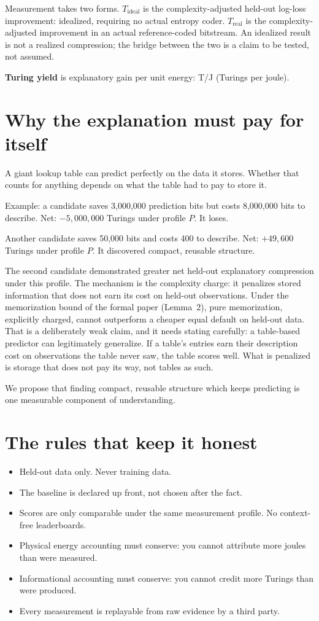 \documentclass[11pt,letterpaper]{article}
\begin{document}
Measurement takes two forms. $T_{\mathrm{ideal}}$ is the complexity-adjusted held-out log-loss improvement: idealized, requiring no actual entropy coder. $T_{\mathrm{real}}$ is the complexity-adjusted improvement in an actual reference-coded bitstream. An idealized result is not a realized compression; the bridge between the two is a claim to be tested, not assumed.

\textbf{Turing yield} is explanatory gain per unit energy: T/J (Turings per joule).

\section{Why the explanation must pay for itself}

A giant lookup table can predict perfectly on the data it stores. Whether that counts for anything depends on what the table had to pay to store it.

Example: a candidate saves 3,000,000 prediction bits but costs 8,000,000 bits to describe. Net: $-5{,}000{,}000$ Turings under profile $P$. It loses.

Another candidate saves 50,000 bits and costs 400 to describe. Net: $+49{,}600$ Turings under profile $P$. It discovered compact, reusable structure.

The second candidate demonstrated greater net held-out explanatory compression under this profile. The mechanism is the complexity charge: it penalizes stored information that does not earn its cost on held-out observations. Under the memorization bound of the formal paper (Lemma~2), pure memorization, explicitly charged, cannot outperform a cheaper equal default on held-out data. That is a deliberately weak claim, and it needs stating carefully: a table-based predictor can legitimately generalize. If a table's entries earn their description cost on observations the table never saw, the table scores well. What is penalized is storage that does not pay its way, not tables as such.

We propose that finding compact, reusable structure which keeps predicting is one measurable component of understanding.

\section{The rules that keep it honest}

\begin{itemize}[leftmargin=*]
\item Held-out data only. Never training data.
\item The baseline is declared up front, not chosen after the fact.
\item Scores are only comparable under the same measurement profile. No context-free leaderboards.
\item Physical energy accounting must conserve: you cannot attribute more joules than were measured.
\item Informational accounting must conserve: you cannot credit more Turings than were produced.
\item Every measurement is replayable from raw evidence by a third party.
\end{itemize}
\end{document}
